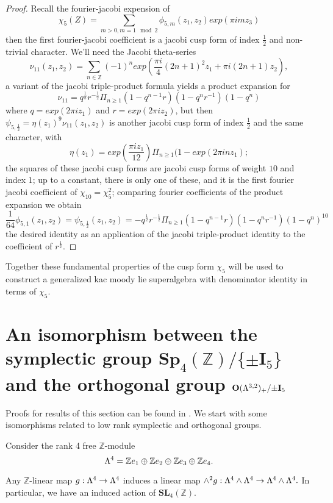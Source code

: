 \documentclass[9pt]{amsart} \usepackage[utf8]{inputenc}
\newcommand{\Z}{\mathbb{Z}} \newcommand{\C}{\mathbb{C}}
\newcommand{\Sp}{\mathbf{Sp}}
\newcommand{\SL}{\mathbf{SL}}
\newcommand{\Orth}{\mathbf{O}}
\newcommand{\Id}{\mathbf{I}}
\begin{document}
\begin{proof}
Recall the fourier-jacobi expension of $$\chi_5(Z) = \sum_{m>0, m = 1
\mod 2} \phi_{5,m} (z_1,z_2)exp (\pi i m z_3)$$
then the first fourier-jacobi coefficient is a jacobi cusp form of index
$\frac{1}{2}$ and non-trivial character. We'll need the Jacobi
theta-series $$\nu_{11}(z_1,z_2) = \sum_{n \in \Z} (-1)^n exp(\frac{\pi
i}{4} (2n + 1)^2 z_1 + \pi i(2n +1) z_2),$$ a variant of the jacobi
triple-product formula yields a product expansion for $$\nu_{11} =
q^{\frac{1}{8}}r^{-\frac{1}{2}} \Pi_{n \geq 1} (1 - q^{n-1} r ) (1 - q^n
r^{-1}) (1 -q^n)$$ where $q = exp(2\pi i z_1)$ and $r = exp(2\pi i
z_2)$, but
then $\psi_{5,\frac{1}{2}} = \eta(z_1)^9 \nu_{11}(z_1,z_2)$ is another
jacobi cusp form of index $\frac{1}{2}$ and the same character, with
$$\eta(z_1) = exp(\frac{\pi i z_1}{12}) \Pi_{n\geq 1} (1 - exp(2\pi i n
z_1);$$ the
squares of these jacobi cusp forms are jacobi cusp forms of weight $10$
and index $1$; up to a constant, there is only one of these, and it is
the first fourier jacobi coefficient of $\chi_{10} = \chi_5^2$;
comparing fourier coefficients of the product expansion we obtain $$\frac{1}{64}
\phi_{5,1}(z_1,z_2) = \psi_{5,\frac{1}{2}}(z_1,z_2) =
-q^{\frac{1}{2}}r^{-\frac{1}{2}}\Pi_{n\geq 1} (1 - q^{n-1}r )(1 -q^n
r^{-1})(1 - q^n)^{10}$$ the
desired identity as an application of the jacobi triple-product identity
to the coefficient of $r^{\frac{1}{2}}$.
\end{proof}
Together these fundamental properties of the cusp form $\chi_5$
will be used to construct a generalized kac moody lie superalgebra with
denominator identity in terms of $\chi_5$.


\section{An isomorphism between
the symplectic group $\Sp_4(\Z)/\{\pm\Id_5\}$ and the orthogonal group
$\Orth(\La^{3,2})_+/{\pm\Id_5}$}

Proofs for results of this section can be found in \cite{KNAPP:1}. We
start with some isomorphisms related to low rank symplectic and
orthogonal groups.


Consider the rank 4 free $\Z$-module $$\La^4 = \Z e_1 \oplus \Z e_2
\oplus \Z e_3 \oplus \Z e_4.$$

Any $\Z$-linear map $g: \Lambda^4 \rightarrow \Lambda^4$ induces a linear map
$\wedge^2 g : \Lambda^4 \wedge \Lambda^4 \rightarrow \Lambda^4 \wedge \Lambda^4.$ In
particular, we have an induced action of $\SL_4(\Z)$.
\end{document}
